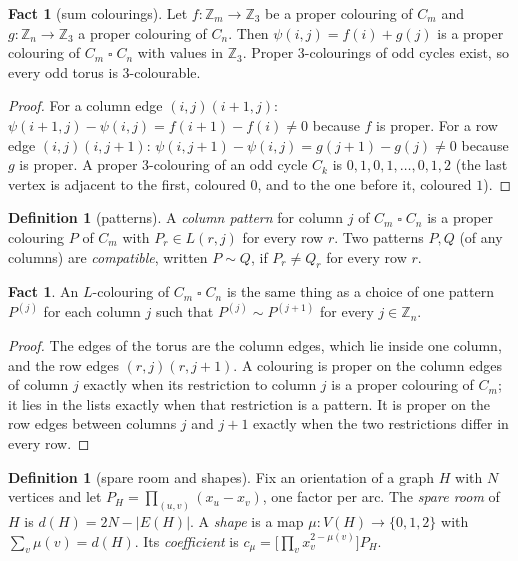 \documentclass[11pt]{article}
\theoremstyle{plain}
\theoremstyle{definition}
\newtheorem{definition}[theorem]{Definition}
\newtheorem{fact}[theorem]{Fact}
\theoremstyle{remark}
\newcommand{\T}{\mathbin{\square}}
\newcommand{\Z}{\mathbb{Z}}
\begin{document}
\begin{fact}[sum colourings]\label{sumcol}
Let $f : \Z_m \to \Z_3$ be a proper colouring of $C_m$ and $g : \Z_n \to \Z_3$ a proper colouring of $C_n$. Then
$\psi(i, j) = f(i) + g(j)$ is a proper colouring of $C_m \T C_n$ with values in $\Z_3$. Proper 3-colourings of
odd cycles exist, so every odd torus is 3-colourable.
\end{fact}

\begin{proof}
For a column edge $(i,j)(i+1,j)$: $\psi(i+1,j) - \psi(i,j) = f(i+1) - f(i) \ne 0$ because $f$ is proper. For a row
edge $(i,j)(i,j+1)$: $\psi(i,j+1) - \psi(i,j) = g(j+1) - g(j) \ne 0$ because $g$ is proper. A proper 3-colouring
of an odd cycle $C_k$ is $0, 1, 0, 1, \dots, 0, 1, 2$ (the last vertex is adjacent to the first, coloured $0$,
and to the one before it, coloured $1$).
\end{proof}

\begin{definition}[patterns]\label{pattern}
A \emph{column pattern} for column $j$ of $C_m \T C_n$ is a proper colouring $P$ of $C_m$ with $P_r \in L(r, j)$
for every row $r$. Two patterns $P, Q$ (of any columns) are \emph{compatible}, written $P \sim Q$, if $P_r \ne Q_r$
for every row $r$.
\end{definition}

\begin{fact}\label{patfact}
An $L$-colouring of $C_m \T C_n$ is the same thing as a choice of one pattern $P^{(j)}$ for each column $j$ such
that $P^{(j)} \sim P^{(j+1)}$ for every $j \in \Z_n$.
\end{fact}

\begin{proof}
The edges of the torus are the column edges, which lie inside one column, and the row edges
$(r, j)(r, j+1)$. A colouring is proper on the column edges of column $j$ exactly when its restriction to
column $j$ is a proper colouring of $C_m$; it lies in the lists exactly when that restriction is a pattern. It
is proper on the row edges between columns $j$ and $j+1$ exactly when the two restrictions differ in every row.
\end{proof}

\begin{definition}[spare room and shapes]\label{shapedef}
Fix an orientation of a graph $H$ with $N$ vertices and let $P_H = \prod_{(u,v)} (x_u - x_v)$, one factor per arc.
The \emph{spare room} of $H$ is $d(H) = 2N - |E(H)|$. A \emph{shape} is a map $\mu : V(H) \to \{0,1,2\}$ with
$\sum_v \mu(v) = d(H)$. Its \emph{coefficient} is $c_\mu = \big[\prod_v x_v^{2 - \mu(v)}\big] P_H$.
\end{definition}
\end{document}
